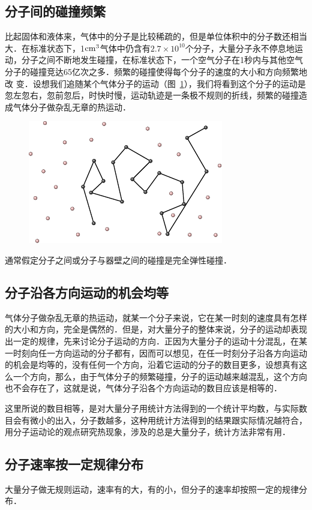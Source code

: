 \subsection{分子间的碰撞频繁} 
比起固体和液体来，气体中的分子是比较稀疏的，但是单位体积中的分子数还相当大．在标准状态下，1${\rm cm^3}$气体中仍含有$2.7\times 10^{10}$个分子，大量分子永不停息地运动，分子之间不断地发生碰撞，在标准状态下，一个空气分子在1秒内与其他空气分子的碰撞竞达65亿次之多．频繁的碰撞使得每个分子的速度的大小和方向频繁地改 
变．设想我们追随某个气体分子的运动（图~\ref{fig_B_3-13}），我们将看到这个分子的运动是忽左忽右，忽前忽后，时快时慢，运动轨迹是一条极不规则的折线，频繁的碰撞造成气体分子做杂乱无章的热运动．
\begin{figure}[htbp]
    \centering
    \includegraphics{fig/B/3-13.pdf}
    \caption{}\label{fig_B_3-13}
\end{figure}

通常假定分子之间或分子与器壁之间的碰撞是完全弹性碰撞．

\subsection{分子沿各方向运动的机会均等} 

气体分子做杂乱无章的热运动，就某一个分子来说，它在某一时刻的速度具有怎样的大小和方向，完全是偶然的．但是，对大量分子的整体来说，分子的运动却表现出一定的规律，先来讨论分子运动的方向．正因为大量分子的运动十分混乱，在某一时刻向任一方向运动的分子都有，因而可以想见，在任一时刻分子沿各方向运动的机会是均等的，没有任何一个方向，沿着它运动的分子的数目更多，设想真有这么一个方向，那么，由于气体分子的频繁碰撞，分子的运动越来越混乱，这个方向也不会存在了，这就是说，气体分子沿各个方向运动的数目应该是相等的．

这里所说的数目相等，是对大量分子用统计方法得到的一个统计平均数，与实际数目会有微小的出入，分子数越多，这种用统计方法得到的结果跟实际情况越符合，用分子运动论的观点研究热现象，涉及的总是大量分子，统计方法非常有用．

\subsection{分子速率按一定规律分布} 
大量分子做无规则运动，速率有的大，有的小，但分子的速率却按照一定的规律分布．

